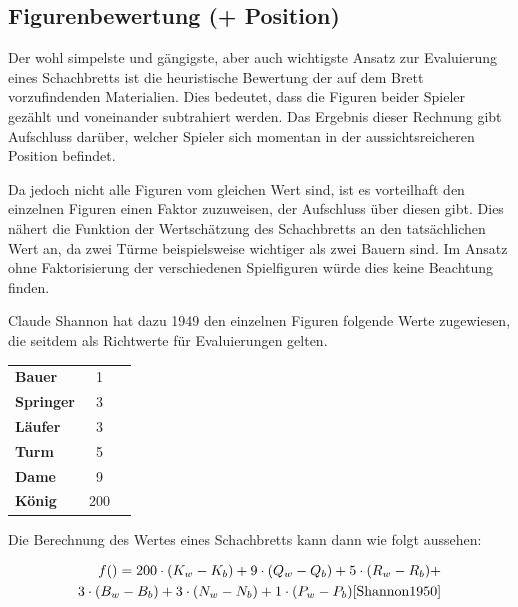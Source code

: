 

\subsection{Figurenbewertung (+ Position)}\label{material_evaluation}

Der wohl simpelste und gängigste, aber auch wichtigste Ansatz zur Evaluierung eines Schachbretts ist die heuristische Bewertung der auf dem Brett vorzufindenden Materialien. Dies bedeutet, dass die Figuren beider Spieler gezählt und voneinander subtrahiert werden. Das Ergebnis dieser Rechnung gibt Aufschluss darüber, welcher Spieler sich momentan in der aussichtsreicheren Position befindet.

Da jedoch nicht alle Figuren vom gleichen Wert sind, ist es vorteilhaft den einzelnen Figuren einen Faktor zuzuweisen, der Aufschluss über diesen gibt. Dies nähert die Funktion der Wertschätzung des Schachbretts an den tatsächlichen Wert an, da zwei Türme beispielsweise wichtiger als zwei Bauern sind. Im Ansatz ohne Faktorisierung der verschiedenen Spielfiguren würde dies keine Beachtung finden.

Claude Shannon hat dazu 1949 den einzelnen Figuren folgende Werte zugewiesen, die seitdem als Richtwerte für Evaluierungen gelten. \cite{Shannon1950}

\begin{tabular}{ l c r }
\textbf{Bauer} & 1\\
\textbf{Springer} & 3 \\
\textbf{Läufer} & 3 \\
\textbf{Turm} & 5 \\
\textbf{Dame} & 9 \\
\textbf{König} & 200
\end{tabular}


Die Berechnung des Wertes eines Schachbretts kann dann wie folgt aussehen:

\begin{equation}
\begin{aligned}
f() = 200 \cdot (K_w-K_b) + 9 \cdot (Q_w-Q_b) + 5 \cdot (R_w-R_b) + \\3 \cdot (B_w-B_b) + 3 \cdot (N_w-N_b) + 1 \cdot (P_w-P_b) \cite{Shannon1950}
\end{aligned}
\end{equation}

